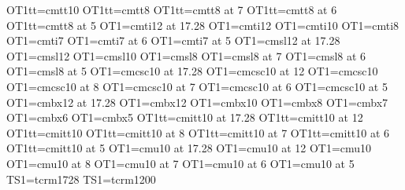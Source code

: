 \hyphenchar\xiitt \MinusOne%
 OT1tt\font\tentt=cmtt10%
\hyphenchar\tentt \MinusOne%
 OT1tt\font\eighttt=cmtt8%
\hyphenchar\eighttt \MinusOne%
 OT1tt\font\seventt=cmtt8 at 7\Unit%
\hyphenchar\seventt \MinusOne%
 OT1tt\font\sixtt=cmtt8 at 6\Unit%
\hyphenchar\sixtt \MinusOne%
 OT1tt\font\fivett=cmtt8 at 5\Unit%
\hyphenchar\fivett \MinusOne%
 OT1\font\xviiit=cmti12 at 17.28\Unit%
 OT1\font\xiiit=cmti12%
 OT1\font\tenit=cmti10%
 OT1\font\eightit=cmti8%
 OT1\font\sevenit=cmti7%
 OT1\font\sixit=cmti7 at 6\Unit%
 OT1\font\fiveit=cmti7 at 5\Unit%
 OT1\font\xviisl=cmsl12 at 17.28\Unit%
 OT1\font\xiisl=cmsl12%
 OT1\font\tensl=cmsl10%
 OT1\font\eightsl=cmsl8%
 OT1\font\sevensl=cmsl8 at 7\Unit%
 OT1\font\sixsl=cmsl8 at 6\Unit%
 OT1\font\fivesl=cmsl8 at 5\Unit%
 OT1\font\xviisc=cmcsc10 at 17.28\Unit%
 OT1\font\xiisc=cmcsc10 at 12\Unit%
 OT1\font\tensc=cmcsc10%
 OT1\font\eightsc=cmcsc10 at 8\Unit%
 OT1\font\sevensc=cmcsc10 at 7\Unit%
 OT1\font\sixsc=cmcsc10 at 6\Unit%
 OT1\font\fivesc=cmcsc10 at 5\Unit%
 OT1\font\xviibf=cmbx12 at 17.28\Unit%
 OT1\font\xiibf=cmbx12%
 OT1\font\tenbf=cmbx10%
 OT1\font\eightbf=cmbx8%
 OT1\font\sevenbf=cmbx7%
 OT1\font\sixbf=cmbx6%
 OT1\font\fivebf=cmbx5%
 OT1tt\font\xviiitt=cmitt10 at 17.28\Unit%
\hyphenchar\xviiitt \MinusOne%
 OT1tt\font\xiiitt=cmitt10 at 12\Unit%
\hyphenchar\xiiitt \MinusOne%
 OT1tt\font\tenitt=cmitt10%
\hyphenchar\tenitt \MinusOne%
 OT1tt\font\eightitt=cmitt10 at 8\Unit%
\hyphenchar\eightitt \MinusOne%
 OT1tt\font\sevenitt=cmitt10 at 7\Unit%
\hyphenchar\sevenitt \MinusOne%
 OT1tt\font\sixitt=cmitt10 at 6\Unit%
\hyphenchar\sixitt \MinusOne%
 OT1tt\font\fiveitt=cmitt10 at 5\Unit%
\hyphenchar\fiveitt \MinusOne%
 OT1\font\xviiu=cmu10 at 17.28\Unit%
 OT1\font\xiiu=cmu10 at 12\Unit%
 OT1\font\tenu=cmu10%
 OT1\font\eightu=cmu10 at 8\Unit%
 OT1\font\sevenu=cmu10 at 7\Unit%
 OT1\font\sixu=cmu10 at 6\Unit%
 OT1\font\fiveu=cmu10 at 5\Unit%
 TS1\font\xviitsr=tcrm1728%
\hyphenchar\xviitsr \MinusOne%
 TS1\font\xiitsr=tcrm1200%
